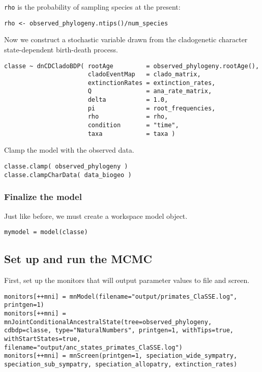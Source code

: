 \texttt{rho} is the probability of sampling species at the present:
{\tt \begin{snugshade*}
\begin{lstlisting}
rho <- observed_phylogeny.ntips()/num_species
\end{lstlisting}
\end{snugshade*}}

Now we construct a stochastic variable drawn from the cladogenetic 
character state-dependent birth-death process.
{\tt \begin{snugshade*}
\begin{lstlisting}
classe ~ dnCDCladoBDP( rootAge         = observed_phylogeny.rootAge(),
                       cladoEventMap   = clado_matrix,
                       extinctionRates = extinction_rates,
                       Q               = ana_rate_matrix,
                       delta           = 1.0,
                       pi              = root_frequencies,
                       rho             = rho,
                       condition       = "time",
                       taxa            = taxa )
\end{lstlisting}
\end{snugshade*}}

Clamp the model with the observed data.
{\tt \begin{snugshade*}
\begin{lstlisting}
classe.clamp( observed_phylogeny )
classe.clampCharData( data_biogeo )
\end{lstlisting}
\end{snugshade*}}

\subsubsection{Finalize the model}

Just like before, we must create a workspace model object.
{\tt \begin{snugshade*}
\begin{lstlisting}
mymodel = model(classe)
\end{lstlisting}
\end{snugshade*}}

\subsection{Set up and run the MCMC}

First, set up the monitors that will output parameter values to file and screen.
{\tt \begin{snugshade*}
\begin{lstlisting}
monitors[++mni] = mnModel(filename="output/primates_ClaSSE.log", printgen=1)
monitors[++mni] = mnJointConditionalAncestralState(tree=observed_phylogeny, cdbdp=classe, type="NaturalNumbers", printgen=1, withTips=true, withStartStates=true, filename="output/anc_states_primates_ClaSSE.log")
monitors[++mni] = mnScreen(printgen=1, speciation_wide_sympatry, speciation_sub_sympatry, speciation_allopatry, extinction_rates)
\end{lstlisting}
\end{snugshade*}}

